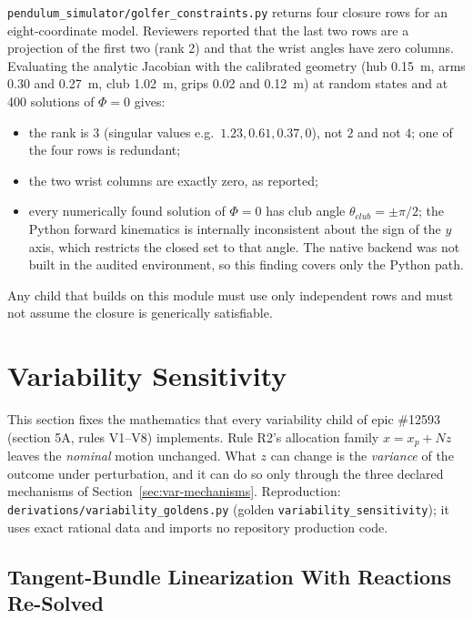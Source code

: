 \documentclass[11pt,a4paper]{article}
\begin{document}
\texttt{pendulum\_simulator/golfer\_constraints.py} returns four closure rows
for an eight-coordinate model.  Reviewers reported that the last two rows are a
projection of the first two (rank 2) and that the wrist angles have zero
columns.  Evaluating the analytic Jacobian with the calibrated geometry
(hub 0.15~m, arms 0.30 and 0.27~m, club 1.02~m, grips 0.02 and 0.12~m) at
random states and at 400 solutions of $\Phi=0$ gives:
\begin{itemize}[leftmargin=*]
\item the rank is $3$ (singular values e.g.\ $1.23,0.61,0.37,0$), not $2$ and
not $4$; one of the four rows is redundant;
\item the two wrist columns are exactly zero, as reported;
\item every numerically found solution of $\Phi=0$ has club angle
$\theta_{club}=\pm\pi/2$; the Python forward kinematics is internally
inconsistent about the sign of the $y$ axis, which restricts the closed set to
that angle.  The native backend was not built in the audited environment, so
this finding covers only the Python path.
\end{itemize}
Any child that builds on this module must use only independent rows and must
not assume the closure is generically satisfiable.

\section{Variability Sensitivity}
\label{sec:variability}

This section fixes the mathematics that every variability child of epic
\#12593 (section 5A, rules V1--V8) implements.  Rule R2's allocation family
$x=x_p+Nz$ leaves the \emph{nominal} motion unchanged.  What $z$ can change is
the \emph{variance} of the outcome under perturbation, and it can do so only
through the three declared mechanisms of Section~\ref{sec:var-mechanisms}.
Reproduction: \texttt{derivations/variability\_goldens.py} (golden
\texttt{variability\_sensitivity}); it uses exact rational data and imports no
repository production code.

\subsection{Tangent-Bundle Linearization With Reactions Re-Solved}
\label{sec:var-lin}
\end{document}
